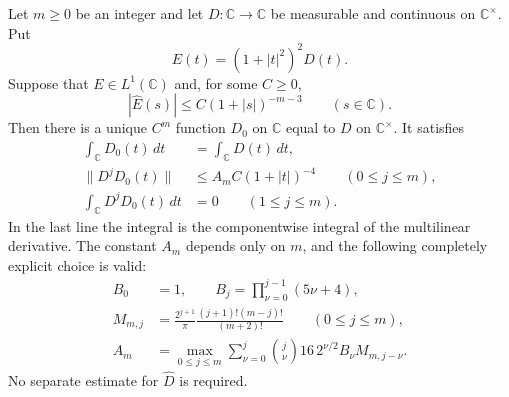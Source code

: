 \begin{theorem}\label{rf-weighted-extension}
Let $m\geq0$ be an integer and let $D:\mathbb C\to\mathbb C$
be measurable and continuous on $\mathbb C^\times$.
Put
\[
                   E(t)=(1+|t|^2)^2D(t).
\]
Suppose that $E\in L^1(\mathbb C)$ and, for some $C\geq0$,
\begin{equation}\label{rf-weighted-decay}
             |\widehat E(s)|\leq C(1+|s|)^{-m-3}
                      \qquad(s\in\mathbb C).
\end{equation}
Then there is a unique $C^m$ function $D_0$ on $\mathbb C$
equal to $D$ on $\mathbb C^\times$.  It satisfies
\begin{align}
 \int_{\mathbb C}D_0(t)\,dt
      &=\int_{\mathbb C}D(t)\,dt, \label{rf-same-integral}\\
 \|D^jD_0(t)\|&\leq A_m C(1+|t|)^{-4}
       \qquad(0\leq j\leq m), \label{rf-all-derivatives}\\
 \int_{\mathbb C}D^jD_0(t)\,dt&=0
       \qquad(1\leq j\leq m). \label{rf-zero-derivatives}
\end{align}
In the last line the integral is the componentwise integral
of the multilinear derivative.  The constant $A_m$ depends
only on $m$, and the following completely explicit choice is valid:
\begin{align*}
 B_0&=1,\qquad B_j=\prod_{\nu=0}^{j-1}(5\nu+4),\\
 M_{m,j}&=\frac{2^{j+1}}{\pi}
                   \frac{(j+1)!(m-j)!}{(m+2)!}
                       \qquad(0\leq j\leq m),\\
 A_m&=\max_{0\leq j\leq m}
       \sum_{\nu=0}^j\binom j\nu
                    16\,2^{\nu/2}B_\nu M_{m,j-\nu}.
\end{align*}
No separate estimate for $\widehat D$ is required.
\end{theorem}

